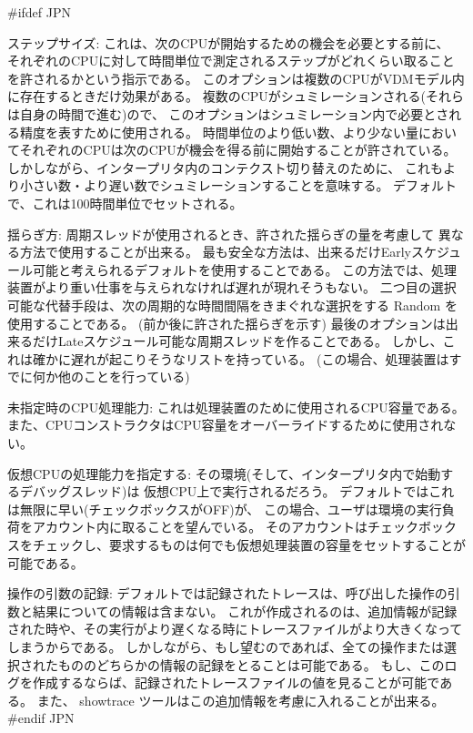 \documentclass[\pformat,12pt]{article}
\begin{document}
\begin{list}{}{}
#ifdef JPN
\item[{\sf ステップサイズ}:] 
これは、次のCPUが開始するための機会を必要とする前に、
それぞれのCPUに対して時間単位で測定されるステップがどれくらい取ることを許されるかという指示である。
このオプションは複数のCPUがVDMモデル内に存在するときだけ効果がある。
複数のCPUがシュミレーションされる(それらは自身の時間で進む)ので、
このオプションはシュミレーション内で必要とされる精度を表すために使用される。 
時間単位のより低い数、より少ない量においてそれぞれのCPUは次のCPUが機会を得る前に開始することが許されている。
しかしながら、インタープリタ内のコンテクスト切り替えのために、
これもより小さい数・より遅い数でシュミレーションすることを意味する。
デフォルトで、これは100時間単位でセットされる。

\item[{\sf 揺らぎ方}:] 周期スレッドが使用されるとき、許された揺らぎの量を考慮して
異なる方法で使用することが出来る。
最も安全な方法は、出来るだけ{\sf Early}スケジュール可能と考えられるデフォルトを使用することである。
この方法では、処理装置がより重い仕事を与えられなければ遅れが現れそうもない。
二つ目の選択可能な代替手段は、次の周期的な時間間隔をきまぐれな選択をする {\sf Random} を使用することである。
(前か後に許された揺らぎを示す)
最後のオプションは出来るだけ{\sf Late}スケジュール可能な周期スレッドを作ることである。
しかし、これは確かに遅れが起こりそうなリストを持っている。
(この場合、処理装置はすでに何か他のことを行っている)

\item[{\sf 未指定時のCPU処理能力}:] これは処理装置のために使用されるCPU容量である。
また、CPUコンストラクタはCPU容量をオーバーライドするために使用されない。

\item[{\sf 仮想CPUの処理能力を指定する}:] その環境(そして、インタープリタ内で始動するデバッグスレッド)は
仮想CPU上で実行されるだろう。
デフォルトではこれは無限に早い(チェックボックスがOFF)が、
この場合、ユーザは環境の実行負荷をアカウント内に取ることを望んでいる。
そのアカウントはチェックボックスをチェックし、要求するものは何でも仮想処理装置の容量をセットすることが可能である。

\item[{\sf 操作の引数の記録}:] デフォルトでは記録されたトレースは、呼び出した操作の引数と結果についての情報は含まない。
これが作成されるのは、追加情報が記録された時や、その実行がより遅くなる時にトレースファイルがより大きくなってしまうからである。
しかしながら、もし望むのであれば、全ての操作または選択されたもののどちらかの情報の記録をとることは可能である。
もし、このログを作成するならば、記録されたトレースファイルの値を見ることが可能である。
また、 {\sf showtrace} ツールはこの追加情報を考慮に入れることが出来る。
#endif JPN
\end{list}
\end{document}
